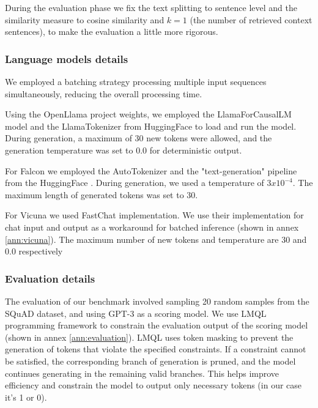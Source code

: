 \documentclass[a4paper,12pt]{article}
\begin{document}
During the evaluation phase we fix the text splitting to sentence level and the similarity measure to cosine similarity and $k=1$ (the number of retrieved context sentences), to make the evaluation a little more rigorous.  

\subsubsection*{Language models details}
We employed a batching strategy processing multiple input sequences simultaneously, reducing the overall processing time.

Using the OpenLlama project \cite{openllama} weights, we employed the LlamaForCausalLM model and the LlamaTokenizer from HuggingFace \cite{huggingface} to load and run the model. 
During generation, a maximum of 30 new tokens were allowed, and the generation temperature was set to 0.0 for deterministic output. 

For Falcon \cite{falcon} we employed the AutoTokenizer and the "text-generation" pipeline from the HuggingFace \cite{huggingface}. 
During generation, we used a temperature of $3x10^{-4}$. The maximum length of generated tokens was set to 30.

For Vicuna \cite{vicuna} we used FastChat \cite{fastchat} implementation.
We use their implementation for chat input and output as a workaround for batched inference (shown in annex \ref*{ann:vicuna}). 
The maximum number of new tokens and temperature are 30 and 0.0 respectively 

\subsubsection*{Evaluation details}
The evaluation of our benchmark involved sampling 20 random samples from the SQuAD \cite{squad} dataset, and using GPT-3 \cite{gpt3} as a scoring model.
We use LMQL \cite{lmql} programming framework to constrain the evaluation output of the scoring model (shown in annex \ref*{ann:evaluation}). LMQL uses token masking to prevent the generation of tokens that violate the specified constraints. 
If a constraint cannot be satisfied, the corresponding branch of generation is pruned, and the model continues generating in the remaining valid branches. This helps improve efficiency and constrain the model to output only necessary tokens 
(in our case it's 1 or 0).

\newpage
\end{document}
